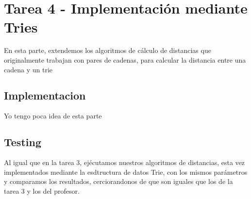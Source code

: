 \section{Tarea 4 - Implementación mediante Tries}
En esta parte, extendemos los algoritmos de cálculo de distancias que originalmente trabajan con pares de cadenas, para
calcular la distancia entre una cadena y un trie
\subsection{Implementacion}
Yo tengo poca idea de esta parte

\subsection{Testing}
Al igual que en la tarea 3, ejécutamos nuestros algoritmos de distancias, esta vez implementados mediante la esdtructura de datos Trie, con los mismos parámetros y comparamos los resultados, cerciorandonos de que son iguales que los de la tarea 3 y los del profesor.


\newpage 